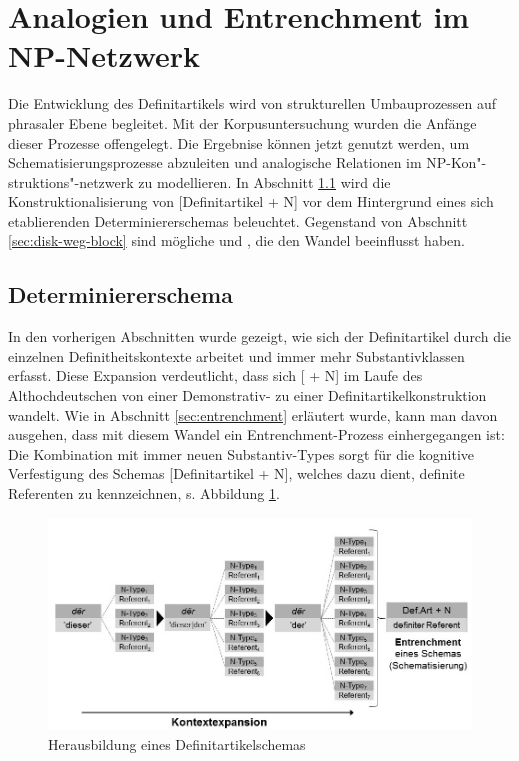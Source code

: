 \section{Analogien und Entrenchment im NP-Netzwerk} \label{sec:disk-ana-entrench}

Die Entwicklung des Definitartikels wird von strukturellen Umbauprozessen auf phrasaler Ebene begleitet. Mit der Korpusuntersuchung wurden die Anfänge dieser Prozesse offengelegt. Die Ergebnise können jetzt genutzt werden, um Schematisierungsprozesse abzuleiten und analogische Relationen im NP-Kon"-struktions"-netzwerk zu modellieren. In Abschnitt \ref{sec:disk-schema} wird die Konstruktionalisierung von [Definitartikel + N] vor dem Hintergrund eines sich etablierenden Determiniererschemas beleuchtet. Gegenstand von Abschnitt \ref{sec:disk-weg-block} sind mögliche  und , die den Wandel beeinflusst haben.  

\subsection{Determiniererschema} \label{sec:disk-schema}

In den vorherigen Abschnitten wurde gezeigt, wie sich der Definitartikel durch die einzelnen Definitheitskontexte arbeitet und immer mehr Substantivklassen erfasst. Diese Expansion verdeutlicht, dass sich [ + N] im Laufe des Althochdeutschen von einer Demonstrativ- zu einer Definitartikelkonstruktion wandelt. 
Wie in Abschnitt \ref{sec:entrenchment} erläutert wurde, kann man davon ausgehen, dass mit diesem Wandel ein Entrenchment-Prozess einhergegangen ist: Die Kombination mit immer neuen Substantiv-Types  sorgt für die kognitive Verfestigung des Schemas [Definitartikel + N], welches dazu dient, definite Referenten zu kennzeichnen, s. Abbildung \ref{abb:entrenchment-ther}. 

\begin{figure}
\begin{center}
  \includegraphics[width=12cm]{images/entrenchment-def-N-neu-sw.jpg}
\caption {Herausbildung eines Definitartikelschemas} 
\label{abb:entrenchment-ther}
\end{center}
\end{figure} 

